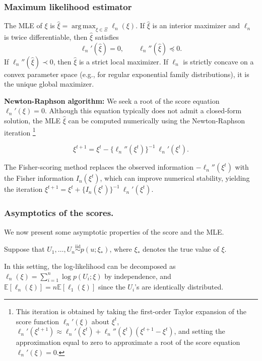 \documentclass{article}
\newenvironment{mybox}{%
  \par\addvspace{10pt}%
  \begin{mdframed}[skipabove=0pt,skipbelow=10pt]%
}{%
  \end{mdframed}%
}
\theoremstyle{break}
\newcommand{\E}{\ensuremath{\mathbb{E}}}
\DeclareMathOperator*{\argmax}{arg\,max}
\begin{document}
\subsubsection{Maximum likelihood estimator} 
The MLE of $\xi$ is $\hat\xi = \argmax_{\xi \in \Xi} \ell_n(\xi)$. 
If $\hat\xi$ is an interior maximizer and $\ell_n$ is twice differentiable, then $\hat\xi$ satisfies
\[
    \ell_n'(\hat{\xi})=0,
    \qquad
    \ell_n''(\hat{\xi})\preceq 0.
\]
If $\ell_n''(\hat{\xi})\prec 0$, then $\hat{\xi}$ is a strict local maximizer. If $\ell_n$ is strictly concave on a convex parameter space (e.g., for regular exponential family distributions), it is the unique global maximizer.

\textbf{Newton-Raphson algorithm:} 
We seek a root of the score equation $\ell_n'(\xi)=0$.
Although this equation typically does not admit a closed-form solution, the MLE $\hat{\xi}$ can be computed numerically using the Newton-Raphson iteration
\footnote{This iteration is obtained by taking the first-order Taylor expansion of the score function $\ell_n'(\xi)$ about $\xi^t$, $\ell_n'(\xi^{t+1}) \approx \ell_n'(\xi^t) + \ell_n''(\xi^t)(\xi^{t+1}-\xi^t)$, and setting the approximation equal to zero to approximate a root of the score equation $\ell_n'(\xi)=0$.}
\begin{mybox}
\begin{equation}\label{eq:newton-raphson}
    \xi^{t+1} = \xi^t - \{\ell_n''(\xi^t)\}^{-1}\ \ell_n'(\xi^t).
\end{equation}
\end{mybox}

The Fisher-scoring method replaces the observed information $-\ell_n''(\xi^t)$ with the Fisher information $I_n(\xi^t)$, which can improve numerical stability, yielding the iteration $\xi^{t+1} = \xi^t + \{I_n(\xi^t)\}^{-1}\ \ell_n'(\xi^t)$.

\subsubsection{Asymptotics of the scores.}
We now present some asymptotic properties of the score and the MLE.

Suppose that $U_1,\ldots,U_n\stackrel{\mathrm{iid}}{\sim}p(u;\xi_*)$, where $\xi_*$ denotes the true value of $\xi$.

In this setting, the log-likelihood can be decomposed as $\ell_n(\xi) = \sum_{i=1}^n \log p(U_i;\xi)$ by independence, and $\E\left[\ell_n(\xi)\right]=n\E\left[\ell_1(\xi)\right]$ since the $U_i$'s are identically distributed.
\end{document}
